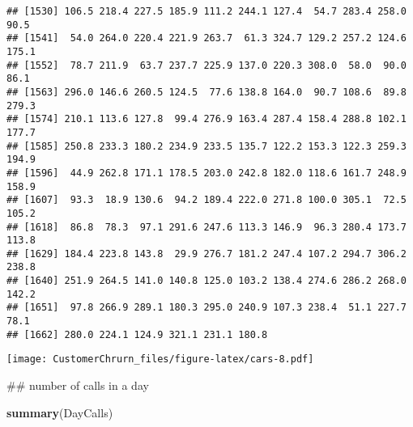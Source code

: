 \documentclass[]{article}
\newenvironment{Shaded}{\begin{snugshade}}{\end{snugshade}}
\newcommand{\KeywordTok}[1]{\textcolor[rgb]{0.13,0.29,0.53}{\textbf{#1}}}
\newcommand{\DataTypeTok}[1]{\textcolor[rgb]{0.13,0.29,0.53}{#1}}
\newcommand{\DecValTok}[1]{\textcolor[rgb]{0.00,0.00,0.81}{#1}}
\newcommand{\StringTok}[1]{\textcolor[rgb]{0.31,0.60,0.02}{#1}}
\newcommand{\OperatorTok}[1]{\textcolor[rgb]{0.81,0.36,0.00}{\textbf{#1}}}
\newcommand{\NormalTok}[1]{#1}
\begin{document}
\begin{verbatim}
## [1530] 106.5 218.4 227.5 185.9 111.2 244.1 127.4  54.7 283.4 258.0  90.5
## [1541]  54.0 264.0 220.4 221.9 263.7  61.3 324.7 129.2 257.2 124.6 175.1
## [1552]  78.7 211.9  63.7 237.7 225.9 137.0 220.3 308.0  58.0  90.0  86.1
## [1563] 296.0 146.6 260.5 124.5  77.6 138.8 164.0  90.7 108.6  89.8 279.3
## [1574] 210.1 113.6 127.8  99.4 276.9 163.4 287.4 158.4 288.8 102.1 177.7
## [1585] 250.8 233.3 180.2 234.9 233.5 135.7 122.2 153.3 122.3 259.3 194.9
## [1596]  44.9 262.8 171.1 178.5 203.0 242.8 182.0 118.6 161.7 248.9 158.9
## [1607]  93.3  18.9 130.6  94.2 189.4 222.0 271.8 100.0 305.1  72.5 105.2
## [1618]  86.8  78.3  97.1 291.6 247.6 113.3 146.9  96.3 280.4 173.7 113.8
## [1629] 184.4 223.8 143.8  29.9 276.7 181.2 247.4 107.2 294.7 306.2 238.8
## [1640] 251.9 264.5 141.0 140.8 125.0 103.2 138.4 274.6 286.2 268.0 142.2
## [1651]  97.8 266.9 289.1 180.3 295.0 240.9 107.3 238.4  51.1 227.7  78.1
## [1662] 280.0 224.1 124.9 321.1 231.1 180.8
\end{verbatim}

\begin{Shaded}
\end{Shaded}

\texttt{[image: CustomerChrurn\_files/figure-latex/cars-8.pdf]}

\begin{Shaded}
\begin{Highlighting}[]
\NormalTok{## number of calls in a day }

\KeywordTok{summary}\NormalTok{(DayCalls)}
\end{Highlighting}
\end{Shaded}
\end{document}

